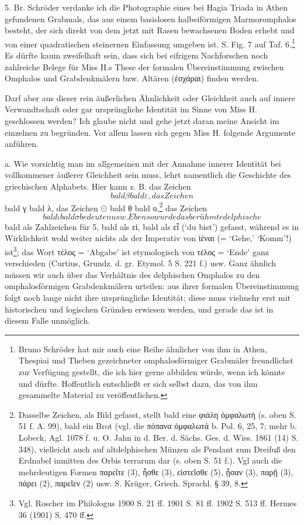 \documentclass[a4paper, 11pt, oneside]{article}
\newcommand*\svgABR{}
\newcommand*\svgABS{}
\newcommand*\svgABT{}
\newcommand*\svgABU{}
\begin{document}
5. Br. Schröder verdanke ich die Photographie eines bei Hagia Triada in Athen gefundenen Grabmals, das aus einem basislosen halbeiförmigen Marmoromphalos besteht, der sich direkt von dem jetzt mit Rasen bewachsenen Boden erhebt und von einer quadratischen steinernen Einfassung umgeben ist. S. Fig. 7 auf Taf. 6.\footnote{Bruno Schröder hat mir auch eine Reihe ähnlicher von ihm in Athen, Thespiai und Theben gezeichneter omphalosförmiger Grabmäler freundlichst zur Verfügung gestellt, die ich hier gerne abbilden würde, wenn ich könnte und dürfte. Hoffentlich entschließt er sich selbst dazu, das von ihm gesammelte Material zu veröffentlichen.} Es dürfte kaum zweifelhaft sein, dass sich bei eifrigem Nachforschen noch zahlreiche Belege für Miss H.s These der formalen Übereinstimmung zwischen Omphalos und Grabdenkmälern bzw. Altären (ἐσχάραι) finden werden.

Darf aber aus dieser rein äußerlichen Ähnlichkeit oder Gleichheit auch auf innere Verwandtschaft oder gar ursprüngliche Identität im Sinne von Miss H. geschlossen werden? Ich glaube nicht und gehe jetzt daran meine Ansicht im einzelnen zu begründen. Vor allem lassen sich gegen Miss H. folgende Argumente anführen.

a. Wie vorsichtig man im allgemeinen mit der Annahme innerer Identität bei vollkommener äußerer Gleichheit sein muss, lehrt namentlich die Geschichte des griechischen Alphabets. Hier kann z. B. das Zeichen $\svgABR$ bald β bald ε, das Zeichen $\svgABS$ bald γ bald λ, das Zeichen $\odot$ bald θ bald ο,\footnote{Dasselbe Zeichen, als Bild gefasst, stellt bald eine φιάλη ὀμφαλωτή (s. oben S. 51 f. A. 99), bald ein Brot (vgl. die πόπανα ὀμφαλωτά b. Pol. 6, 25, 7; mehr b. Lobeck, Agl. 1078 f. u. O. Jahn in d. Ber. d. Sächs. Ges. d. Wiss. 1861 (14) S. 348), vielleicht auch auf altdelphischen Münzen als Pendant zum Dreifuß den Erdnabel inmitten des Orbis terrarum dar (s. oben S. 51 f.). Vgl auch die mehrdeutigen Formen παρεῖτε (3), ἦσθε (3), εἰστεῖσθε (5), ᾖσαν (3), παρῇ (3), πάρει (2), παρεῖεν (2) usw. S. Krüger, Griech. Sprachl. § 39, 8.} das Zeichen $\svgABT$ bald ι bald σ bedeuten usw. Ebenso wurde das berühmte delphische $\svgABU$ bald als Zahlzeichen für 5, bald als εἰ, bald als εἶ (`du bist') gefasst, während es in Wirklichkeit wohl weiter nichts als der Imperativ von ἰέναι (= `Gehe,' `Komm'!) ist\footnote{Vgl. Roscher im Philologus 1900 S. 21 ff. 1901 S. 81 ff. 1902 S. 513 ff. Hermes 36 (1901) S. 470 ff.}; das Wort τέλος = `Abgabe' ist etymologisch von τέλος = `Ende' ganz verschieden (Curtius, Grundz. d. gr. Etymol. 5 S. 221 f.) usw. Ganz ähnlich müssen wir auch über das Verhältnis des delphischen Omphalos zu den omphalosförmigen Grabdenkmälern urteilen: aus ihrer formalen Übereinstimmung folgt noch lange nicht ihre ursprüngliche Identität; diese muss vielmehr erst mit historischen und logischen Gründen erwiesen werden, und gerade das ist in diesem Falle unmöglich.
\end{document}
